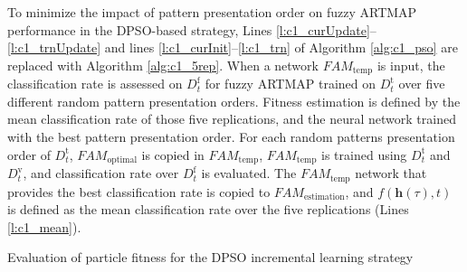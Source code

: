 To minimize the impact of pattern presentation order on fuzzy ARTMAP performance in the DPSO-based strategy, Lines \ref{l:c1_curUpdate}--\ref{l:c1_trnUpdate} and lines \ref{l:c1_curInit}--\ref{l:c1_trn} of Algorithm \ref{alg:c1_pso} are replaced with Algorithm \ref{alg:c1_5rep}. When a network $\textit{FAM}_\text{temp}$ is input, the classification rate is assessed on $D_t^\text{f}$ for fuzzy ARTMAP trained on  $D_t^\text{t}$ over five different random pattern presentation orders. Fitness estimation is defined by the mean classification rate of those five replications, and the neural network trained with the best pattern presentation order. For each random patterns presentation order of $D_t^\text{t}$, $\textit{FAM}_\text{optimal}$ is copied in $\textit{FAM}_\text{temp}$, $\textit{FAM}_\text{temp}$ is trained using $D_t^\text{t}$ and $D_t^\text{v}$, and classification rate over $D_t^\text{f}$ is evaluated. The $\textit{FAM}_\text{temp}$ network that provides the best classification rate is copied to $\textit{FAM}_\text{estimation}$, and $f(\textbf{h}(\tau),t)$ is defined as the mean classification rate over the five replications (Lines \ref{l:c1_mean}).

\begin{algorithm}[t]
	\caption{Evaluation of particle fitness for the DPSO incremental learning
					 strategy}
	\label{alg:c1_5rep}
\end{algorithm}

